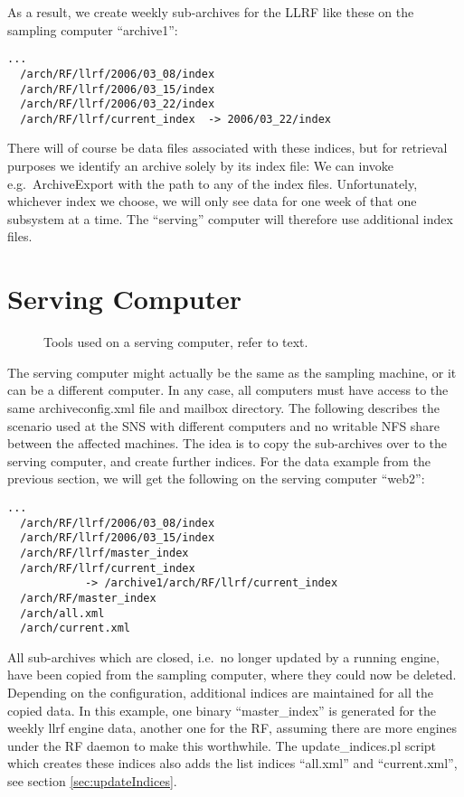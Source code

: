 \noindent As a result, we create weekly sub-archives for the LLRF like
these on the sampling computer ``archive1'':
\begin{lstlisting}[frame=none,keywordstyle=\sffamily]
  ...
  /arch/RF/llrf/2006/03_08/index
  /arch/RF/llrf/2006/03_15/index
  /arch/RF/llrf/2006/03_22/index
  /arch/RF/llrf/current_index  -> 2006/03_22/index
\end{lstlisting}
\noindent There will of course be data files associated with these
indices, but for retrieval purposes we identify an
archive solely by its index file: We can invoke e.g.\ ArchiveExport
with the path to any of the index files. 
Unfortunately, whichever index we choose, we will only see data for
one week of that one subsystem at a time.
The ``serving'' computer will therefore use additional index files.

\section{Serving Computer}  \label{sec:exampleServe}
\begin{figure}[htb]
\begin{center}
\end{center}
\caption{\label{fig:acServe}Tools used on a serving computer, refer to text.}
\end{figure}

\noindent The serving computer might actually be the same as the
sampling machine, or it can be a different computer. In any case, all
computers must have access to the same archiveconfig.xml file and
mailbox directory.
The following describes the scenario used at the SNS with 
different computers and no writable NFS share between the
affected machines.
The idea is to copy the sub-archives over to the serving computer, and
create further indices. For the data example from the
previous section, we will get the following on the serving computer ``web2'':
\begin{lstlisting}[frame=none,keywordstyle=\sffamily]
  ...
  /arch/RF/llrf/2006/03_08/index
  /arch/RF/llrf/2006/03_15/index
  /arch/RF/llrf/master_index     
  /arch/RF/llrf/current_index 
            -> /archive1/arch/RF/llrf/current_index
  /arch/RF/master_index 
  /arch/all.xml
  /arch/current.xml
\end{lstlisting}
\noindent All sub-archives which are closed, i.e.\ no longer updated
by a running engine, have been copied from the sampling computer,
where they could now be deleted.
Depending on the configuration, additional indices are maintained for
all the copied data. 
In this example, one binary ``master\_index'' is generated for the
weekly llrf engine data, another one for the RF, assuming there are
more engines under the RF daemon to make this worthwhile.
The update\_indices.pl script which creates these indices also adds
the list indices ``all.xml'' and ``current.xml'', see section
\ref{sec:updateIndices}.

